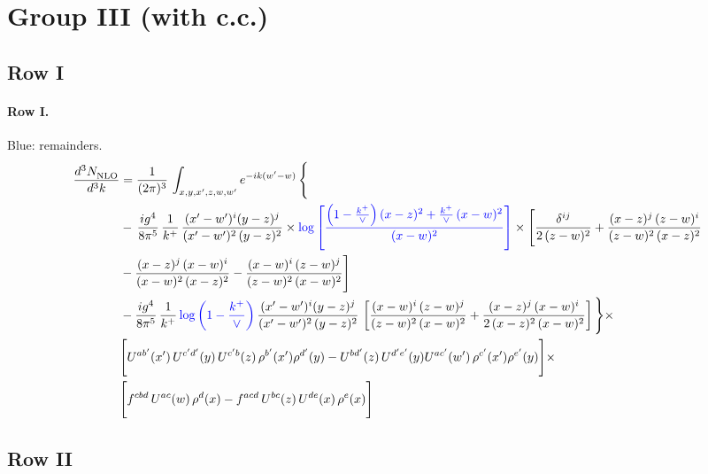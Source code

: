 \documentclass[10pt]{article}
\numberwithin{equation}{section}
\newcommand{\new}[1]{{\color{blue}#1}}
\begin{document}
\section{Group III (with c.c.)}\label{sec:FgIII}
\subsection{Row I}
\paragraph{Row I.}
\new{Blue}: remainders.
\begin{align}
     \frac{d^{3}N_{\rm NLO}^{\rm}}{d^{3}k}  & =   \frac{1}{(2\pi)^{3}}\, \int_{x,y,x',z,w,w^{\prime}} e^{-ik(w^{\prime}-w)}\, \Bigg\{\notag \\
& -\,\frac{ig^{4}}{8\pi^{5}}\,\frac{1}{k^{+}}\,\frac{(x'-w')^{i}(y-z)^{j}}{(x'-w')^{2}\,(y-z)^{2}}\times \new{\log{\left[\frac{\left(1-\frac{k^{+}}{\vee}\right)(x-z)^{2}+\frac{k^{+}}{\vee}\,(x-w)^{2}}{(x-w)^{2}}\right]}}\times \Bigg[\frac{\delta^{ij}}{2\,(z-w)^{2}}+\frac{(x-z)^{j}\,(z-w)^{i}}{(z-w)^{2}\,(x-z)^{2}}\notag \\ & -\frac{(x-z)^{j}\,(x-w)^{i}}{(x-w)^{2}\,(x-z)^{2}}-\frac{(x-w)^{i}\,(z-w)^{j}}{(z-w)^{2}\,(x-w)^{2}}\Bigg] \notag \\
&  -\frac{ig^{4}}{8\pi^{5}}\,\frac{1}{k^{+}}\,\new{\log{\left(1-\frac{k^{+}}{\vee}\right)}}\,\frac{(x'-w')^{i}(y-z)^{j}}{(x'-w')^{2}\,(y-z)^{2}}\,\left[\frac{(x-w)^{i}\,(z-w)^{j}}{(z-w)^{2}\,(x-w)^{2}}+\frac{(x-z)^{j}\,(x-w)^{i}}{2\,(x-z)^{2}\, (x-w)^{2}}\right]\Bigg\}\times \notag \\ &  \Bigg[U^{ab'}(x')\,U^{c'd'}(y)\,U^{c'b}(z)\,\rho^{b'}(x')\rho^{d'}(y)-U^{bd'}(z)\,U^{d'e'}(y)U^{ac'}(w')\,\rho^{c'}(x')\rho^{e'}(y)\Bigg]\times\notag \\ & \Bigg[f^{cbd}\,U^{ac}(w)\,\rho^{d}(x)-f^{acd}\, U^{bc}(z)\,U^{de}(x)\,\rho^{e}(x)\Bigg] \label{eq:F:G3I}
\end{align}

\subsection{Row II}
\end{document}
